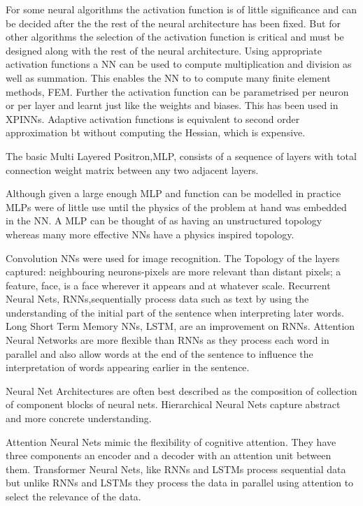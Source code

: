 For some neural algorithms the activation function is of little significance and can be decided after the the rest of the neural architecture has been fixed. But for other algorithms the selection of the activation function is critical and must be designed along with the rest of the neural architecture.
Using appropriate activation functions a NN can be used to compute multiplication and division as well as summation. This enables the NN to to compute many  finite element methods, FEM.
 Further the activation function can be parametrised per neuron or per layer and learnt just like the weights and biases. This has been used in XPINNs.  Adaptive activation functions is equivalent to second order approximation bt without computing the Hessian, which is expensive.




The basic Multi Layered Positron,MLP, consists of a sequence of layers with total connection weight matrix between any two adjacent layers. 


Although given a large enough MLP and function can be modelled in practice MLPs were of little use until the physics of the problem at hand was embedded in the NN. A MLP can be thought of as having an unstructured topology whereas many more effective NNs have a physics inspired topology.



Convolution NNs were used for image recognition. The Topology of the layers captured: neighbouring neurons-pixels are more relevant than distant pixels; a feature, face, is a face wherever it appears and at whatever scale. Recurrent Neural Nets, RNNs,sequentially process data such as text by using the understanding of the initial part of the sentence when interpreting later words. Long Short Term Memory NNs, LSTM, are an improvement on RNNs. 
Attention Neural Networks are more flexible than RNNs as they process each word in parallel and also allow words at the end of the sentence to influence the interpretation of words appearing earlier in the sentence.

 Neural Net Architectures are often best described as the composition of collection of component  blocks of neural nets. Hierarchical Neural Nets capture abstract and more concrete understanding. 
 
 
 Attention Neural Nets mimic the flexibility of cognitive attention. They have three components an encoder and a decoder with an attention unit between them.
Transformer Neural Nets, like RNNs and LSTMs process sequential data but unlike RNNs and LSTMs they process the data in parallel using attention to select the relevance of the data.






